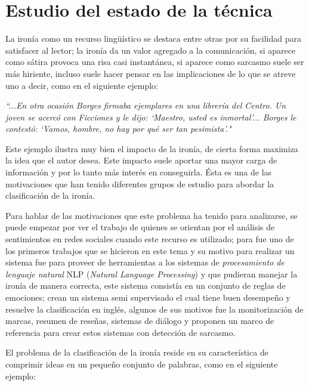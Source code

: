 \chapter{Estudio del estado de la técnica}\label{cap.antecedentes}

\par La ironía como un recurso lingüístico se destaca entre otras por su facilidad para satisfacer al lector; la ironía da un valor agregado a la comunicación, si aparece como sátira provoca una risa casi instantánea, si aparece como sarcasmo suele ser más hiriente, incluso suele hacer pensar en las implicaciones de lo que se atreve uno a decir, como en el siguiente ejemplo:

\begin{center}
	\textit{``...En otra ocasión Borges firmaba ejemplares en una librería del Centro. Un joven se acercó con Ficciones y le dijo: `Maestro, usted es inmortal'... Borges le contestó: `Vamos, hombre, no hay por qué ser tan pesimista'."} \textcite{Sergio2012}
	\vspace{5pt}
\end{center}
\vspace{5pt}

\par Este ejemplo ilustra muy bien el impacto de la ironía, de cierta forma maximiza la idea que el autor desea. Este impacto suele aportar una mayor carga de información y por lo tanto más interés en conseguirla. Ésta es una de las motivaciones que han tenido diferentes grupos de estudio para abordar la clasificación de la ironía.

\par Para hablar de las motivaciones que este problema ha tenido para analizarse, se puede empezar por ver el trabajo de \textcite{maynard2014cares} quienes se orientan por el análisis de sentimientos en redes sociales cuando este recurso es utilizado; para \textcite{utsumi1995interpret} fue uno de los primeros trabajos que se hicieron en este tema y su motivo para realizar un sistema fue para proveer de herramientas a los sistemas de \textit{procesamiento de lenguaje natural} NLP (\textit{Natural Language Processing}) y que pudieran manejar la ironía de manera correcta, este sistema consistía en un conjunto de reglas de emociones; \textcite{davidov2010semi} crean un sistema semi supervisado el cual tiene buen desempeño y resuelve la clasificación en inglés, algunos de sus motivos fue la monitorización de marcas, resumen de reseñas, sistemas de diálogo y proponen un marco de referencia para crear estos sistemas con detección de sarcasmo.
\par El problema de la clasificación de la ironía reside en su característica de comprimir ideas en un pequeño conjunto de palabras, como en el siguiente ejemplo:

